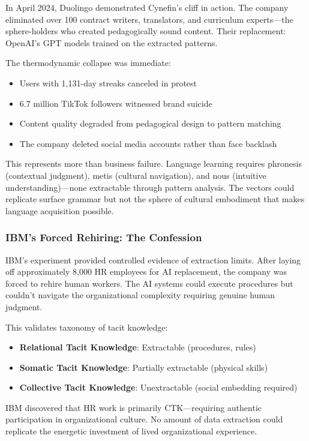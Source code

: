 In April 2024, Duolingo demonstrated Cynefin's cliff in action. The company eliminated over 100 contract writers, translators, and curriculum experts---the sphere-holders who created pedagogically sound content. Their replacement: OpenAI's GPT models trained on the extracted patterns.

The thermodynamic collapse was immediate:
\begin{itemize}
\item Users with 1,131-day streaks canceled in protest
\item 6.7 million TikTok followers witnessed brand suicide
\item Content quality degraded from pedagogical design to pattern matching
\item The company deleted social media accounts rather than face backlash
\end{itemize}

This represents more than business failure. Language learning requires phronesis (contextual judgment), metis (cultural navigation), and nous (intuitive understanding)---none extractable through pattern analysis. The vectors could replicate surface grammar but not the sphere of cultural embodiment that makes language acquisition possible.

\subsubsection{IBM's Forced Rehiring: The Confession}

IBM's experiment provided controlled evidence of extraction limits. After laying off approximately 8,000 HR employees for AI replacement, the company was forced to rehire human workers. The AI systems could execute procedures but couldn't navigate the organizational complexity requiring genuine human judgment.

This validates \citet{collins2010} taxonomy of tacit knowledge:
\begin{itemize}
\item \textbf{Relational Tacit Knowledge}: Extractable (procedures, rules)
\item \textbf{Somatic Tacit Knowledge}: Partially extractable (physical skills)
\item \textbf{Collective Tacit Knowledge}: Unextractable (social embedding required)
\end{itemize}

IBM discovered that HR work is primarily CTK---requiring authentic participation in organizational culture. No amount of data extraction could replicate the energetic investment of lived organizational experience.

